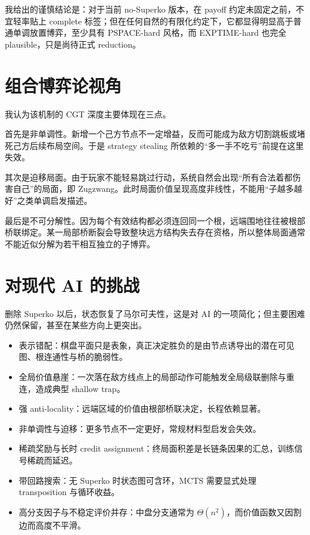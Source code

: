 \documentclass[12pt]{ctexart}
\begin{document}
我给出的谨慎结论是：对于当前 no-Superko 版本，在 payoff 约定未固定之前，不宜轻率贴上 complete 标签；但在任何自然的有限化约定下，它都显得明显高于普通单调放置博弈，至少具有 PSPACE-hard 风格，而 EXPTIME-hard 也完全 plausible，只是尚待正式 reduction。

\section*{组合博弈论视角}

我认为该机制的 CGT 深度主要体现在三点。

首先是非单调性。新增一个己方节点不一定增益，反而可能成为敌方切割跳板或堵死己方后续布局空间。于是 strategy stealing 所依赖的“多一手不吃亏”前提在这里失效。

其次是迫移局面。由于玩家不能轻易跳过行动，系统自然会出现“所有合法着都伤害自己”的局面，即 Zugzwang。此时局面价值呈现高度非线性，不能用“子越多越好”之类单调启发描述。

最后是不可分解性。因为每个有效结构都必须连回同一个根，远端围地往往被根部桥联绑定。某一局部桥断裂会导致整块远方结构失去存在资格，所以整体局面通常不能近似分解为若干相互独立的子博弈。

\section*{对现代 AI 的挑战}

删除 Superko 以后，状态恢复了马尔可夫性，这是对 AI 的一项简化；但主要困难仍然保留，甚至在某些方向上更突出。

\begin{itemize}
\item 表示错配：棋盘平面只是表象，真正决定胜负的是由节点诱导出的潜在可见图、根连通性与桥的脆弱性。
\item 全局价值悬崖：一次落在敌方线点上的局部动作可能触发全局级联删除与重连，造成典型 shallow trap。
\item 强 anti-locality：远端区域的价值由根部桥联决定，长程依赖显著。
\item 非单调性与迫移：更多节点不一定更好，常规材料型启发会失效。
\item 稀疏奖励与长时 credit assignment：终局面积差是长链条因果的汇总，训练信号稀疏而延迟。
\item 带回路搜索：无 Superko 时状态图可含环，MCTS 需要显式处理 transposition 与循环收益。
\item 高分支因子与不稳定评价并存：中盘分支通常为 \(\Theta(n^2)\)，而价值函数又因割边而高度不平滑。
\end{itemize}
\end{document}
